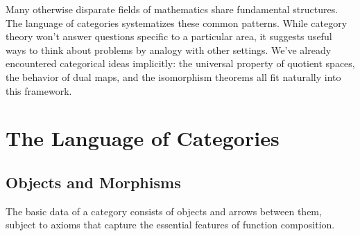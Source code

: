 \documentclass{report}
\begin{document}

Many otherwise disparate fields of mathematics share fundamental structures. The language of categories systematizes these common patterns. While category theory won't answer questions specific to a particular area, it suggests useful ways to think about problems by analogy with other settings. We've already encountered categorical ideas implicitly: the universal property of quotient spaces, the behavior of dual maps, and the isomorphism theorems all fit naturally into this framework.

\section{The Language of Categories}

\subsection{Objects and Morphisms}

The basic data of a category consists of objects and arrows between them, subject to axioms that capture the essential features of function composition.

\end{document}
